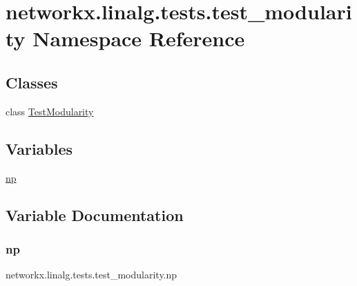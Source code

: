 \hypertarget{namespacenetworkx_1_1linalg_1_1tests_1_1test__modularity}{}\section{networkx.\+linalg.\+tests.\+test\+\_\+modularity Namespace Reference}
\label{namespacenetworkx_1_1linalg_1_1tests_1_1test__modularity}
\subsection*{Classes}
\begin{DoxyCompactItemize}
\item 
class \hyperlink{classnetworkx_1_1linalg_1_1tests_1_1test__modularity_1_1TestModularity}{Test\+Modularity}
\end{DoxyCompactItemize}
\subsection*{Variables}
\begin{DoxyCompactItemize}
\item 
\hyperlink{namespacenetworkx_1_1linalg_1_1tests_1_1test__modularity_a47583ad83e1c132b523d61485fce44ba}{np}
\end{DoxyCompactItemize}


\subsection{Variable Documentation}
\mbox{\label{namespacenetworkx_1_1linalg_1_1tests_1_1test__modularity_a47583ad83e1c132b523d61485fce44ba}} 
\subsubsection{\texorpdfstring{np}{np}}
{\footnotesize\ttfamily networkx.\+linalg.\+tests.\+test\+\_\+modularity.\+np}

